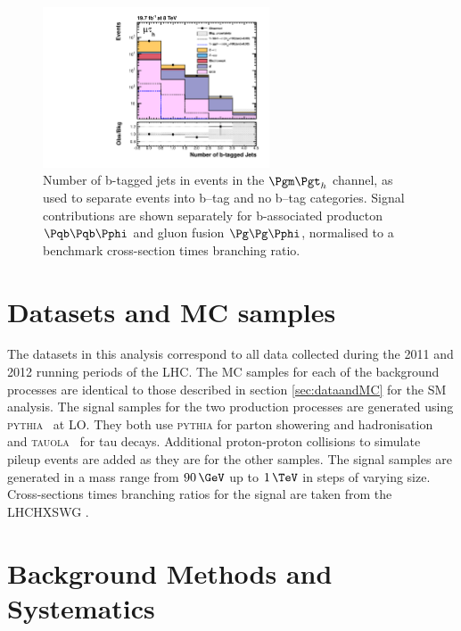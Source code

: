 \begin{figure}[tbh]
\includegraphics[width=0.6\textwidth]{plots/htt-mssm/n_bjets_inclusive_mt_2012_log.pdf}

\caption[Number of b-tagged jets in events in the $\mutau$ channel, as used to separate
events into b--tag and no b--tag categories.]{Number of b-tagged jets in events
in the $\mutau$ channel, as used to separate
events into b--tag and no b--tag categories. Signal contributions are shown
separately for b-associated producton $\Pqb\Pqb\Pphi$ and gluon fusion
$\Pg\Pg\Pphi$, normalised to a benchmark cross-section times branching ratio.}
\label{fig:nbtag}
\end{figure}

\section{Datasets and \ac{MC} samples}
\label{sec:mssmdataandMC}

The datasets in this analysis correspond to all data collected during the 2011
and 2012 running periods of the \ac{LHC}.
The \ac{MC} samples for each of the background processes are
identical to those described in section \ref{sec:dataandMC} for the \ac{SM}
analysis. The signal samples for the two production processes are
generated using \textsc{pythia}~\cite{Sjostrand:2006za} at \ac{LO}. They both use \textsc{pythia}
for parton showering and hadronisation and \textsc{tauola}~\cite{TAUOLA} for tau
decays. Additional proton-proton collisions to simulate pileup events are added
as they are for the other samples. The signal samples are generated in a mass range from
$90\,\GeV$ up to $1\,\TeV$ in steps of varying size. Cross-sections times
branching ratios for the signal are taken from the \ac{LHCHXSWG}
\cite{LHCHiggsCrossSectionWorkingGroup:2011ti,Dittmaier:2012vm,Heinemeyer:2013tqa}.

\section{Background Methods and Systematics}
\label{sec:mssmBackgroundsSysts}

